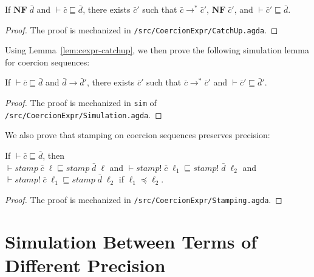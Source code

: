 \begin{lemma}
\label{lem:cexpr-catchup}
If $\mathbf{NF}\; \bar{d}$ and $\vdash \bar{c} \sqsubseteq \bar{d}$,
there exists $\bar{c}'$ such that $\bar{c} \longrightarrow^{*} \bar{c}'$,
$\mathbf{NF}\; \bar{c}'$, and $\vdash \bar{c}' \sqsubseteq \bar{d}$.
\end{lemma}
\begin{proof}
  The proof is mechanized in \texttt{/src/CoercionExpr/CatchUp.agda}.
\end{proof}

\noindent Using Lemma~\ref{lem:cexpr-catchup}, we then prove the following
simulation lemma for coercion sequences:

\begin{lemma}
\label{lem:cexpr-sim}
If $\vdash \bar{c} \sqsubseteq \bar{d}$ and $\bar{d} \longrightarrow \bar{d}'$,
there exists $\bar{c}'$ such that $\bar{c} \longrightarrow^{*} \bar{c}'$
and $\vdash \bar{c}' \sqsubseteq \bar{d}'$.
\end{lemma}
\begin{proof}
  The proof is mechanized in \texttt{sim} of \texttt{/src/CoercionExpr/Simulation.agda}.
\end{proof}

We also prove that stamping on coercion sequences preserves precision:

\begin{lemma}
\label{lem:cexpr-stamp-sim}
If $\vdash \bar{c} \sqsubseteq \bar{d}$, then \\ $\vdash \mathit{stamp}\;\bar{c}\;\ell \sqsubseteq \mathit{stamp}\;\bar{d}\;\ell$
and $\vdash \mathit{stamp!}\;\bar{c}\;\ell_1 \sqsubseteq \mathit{stamp!}\;\bar{d}\;\ell_2$ and
$\vdash \mathit{stamp!}\;\bar{c}\;\ell_1 \sqsubseteq \mathit{stamp}\;\bar{d}\;\ell_2$ if $\ell_1 \preccurlyeq \ell_2$.
\end{lemma}
\begin{proof}
  The proof is mechanized in \texttt{/src/CoercionExpr/Stamping.agda}.
\end{proof}

\section{Simulation Between \CC Terms of Different Precision}
\label{sec:simulation}

